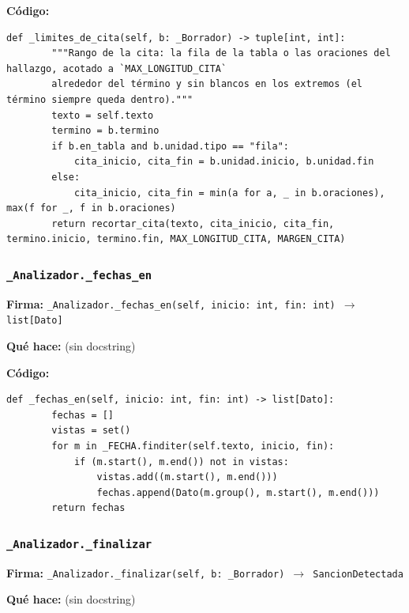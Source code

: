 \documentclass[11pt,a4paper]{article}
\begin{document}
\textbf{Código:}
\begin{lstlisting}
def _limites_de_cita(self, b: _Borrador) -> tuple[int, int]:
        """Rango de la cita: la fila de la tabla o las oraciones del hallazgo, acotado a `MAX_LONGITUD_CITA`
        alrededor del término y sin blancos en los extremos (el término siempre queda dentro)."""
        texto = self.texto
        termino = b.termino
        if b.en_tabla and b.unidad.tipo == "fila":
            cita_inicio, cita_fin = b.unidad.inicio, b.unidad.fin
        else:
            cita_inicio, cita_fin = min(a for a, _ in b.oraciones), max(f for _, f in b.oraciones)
        return recortar_cita(texto, cita_inicio, cita_fin, termino.inicio, termino.fin, MAX_LONGITUD_CITA, MARGEN_CITA)
\end{lstlisting}

\subsubsection*{\texttt{\_Analizador.\_fechas\_en}}
\textbf{Firma:} \texttt{\_Analizador.\_fechas\_en(self, inicio: int, fin: int) $\rightarrow$ list[Dato]}

\textbf{Qué hace:} (sin docstring)

\textbf{Código:}
\begin{lstlisting}
def _fechas_en(self, inicio: int, fin: int) -> list[Dato]:
        fechas = []
        vistas = set()
        for m in _FECHA.finditer(self.texto, inicio, fin):
            if (m.start(), m.end()) not in vistas:
                vistas.add((m.start(), m.end()))
                fechas.append(Dato(m.group(), m.start(), m.end()))
        return fechas
\end{lstlisting}

\subsubsection*{\texttt{\_Analizador.\_finalizar}}
\textbf{Firma:} \texttt{\_Analizador.\_finalizar(self, b: \_Borrador) $\rightarrow$ SancionDetectada}

\textbf{Qué hace:} (sin docstring)
\end{document}

